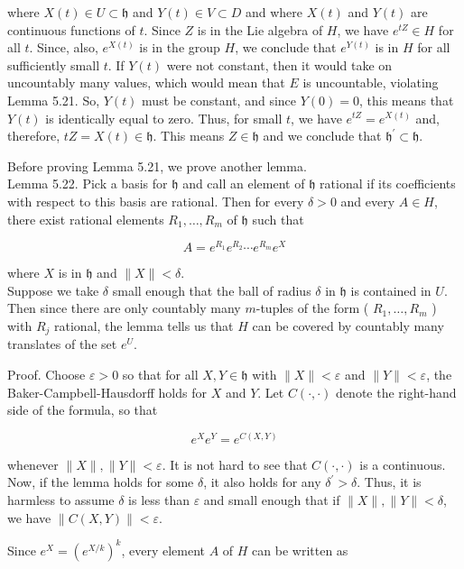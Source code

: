 \documentclass[10pt, letterpaper]{article}
\begin{document}
where $X(t) \in U \subset \mathfrak{h}$ and $Y(t) \in V \subset D$ and where $X(t)$ and $Y(t)$ are continuous functions of $t$. Since $Z$ is in the Lie algebra of $H$, we have $e^{t Z} \in H$ for all $t$. Since, also, $e^{X(t)}$ is in the group $H$, we conclude that $e^{Y(t)}$ is in $H$ for all sufficiently small $t$. If $Y(t)$ were not constant, then it would take on uncountably many values, which would mean that $E$ is uncountable, violating Lemma 5.21. So, $Y(t)$ must be constant, and since $Y(0)=0$, this means that $Y(t)$ is identically equal to zero. Thus, for small $t$, we have $e^{t Z}=e^{X(t)}$ and, therefore, $t Z=X(t) \in \mathfrak{h}$. This means $Z \in \mathfrak{h}$ and we conclude that $\mathfrak{h}^{\prime} \subset \mathfrak{h}$.

Before proving Lemma 5.21, we prove another lemma.\\
Lemma 5.22. Pick a basis for $\mathfrak{h}$ and call an element of $\mathfrak{h}$ rational if its coefficients with respect to this basis are rational. Then for every $\delta>0$ and every $A \in H$, there exist rational elements $R_{1}, \ldots, R_{m}$ of $\mathfrak{h}$ such that

$$
A=e^{R_{1}} e^{R_{2}} \cdots e^{R_{m}} e^{X}
$$

where $X$ is in $\mathfrak{h}$ and $\|X\|<\delta$.\\
Suppose we take $\delta$ small enough that the ball of radius $\delta$ in $\mathfrak{h}$ is contained in $U$. Then since there are only countably many $m$-tuples of the form ( $R_{1}, \ldots, R_{m}$ ) with $R_{j}$ rational, the lemma tells us that $H$ can be covered by countably many translates of the set $e^{U}$.

Proof. Choose $\varepsilon>0$ so that for all $X, Y \in \mathfrak{h}$ with $\|X\|<\varepsilon$ and $\|Y\|<\varepsilon$, the Baker-Campbell-Hausdorff holds for $X$ and $Y$. Let $C(\cdot, \cdot)$ denote the right-hand side of the formula, so that

$$
e^{X} e^{Y}=e^{C(X, Y)}
$$

whenever $\|X\|,\|Y\|<\varepsilon$. It is not hard to see that $C(\cdot, \cdot)$ is a continuous. Now, if the lemma holds for some $\delta$, it also holds for any $\delta^{\prime}>\delta$. Thus, it is harmless to assume $\delta$ is less than $\varepsilon$ and small enough that if $\|X\|,\|Y\|<\delta$, we have $\|C(X, Y)\|<\varepsilon$.

Since $e^{X}=\left(e^{X / k}\right)^{k}$, every element $A$ of $H$ can be written as
\end{document}
